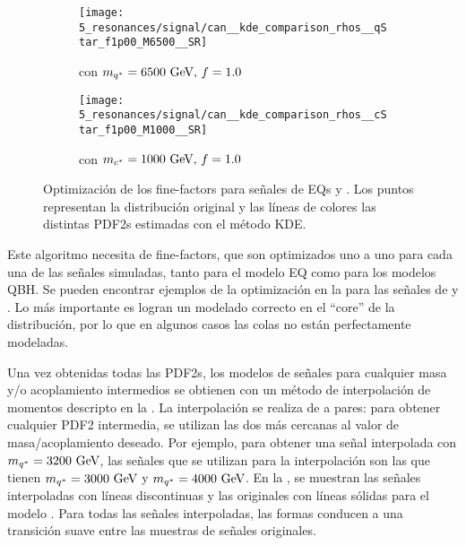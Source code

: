 \begin{figure}[ht!]
    \centering
    \begin{subfigure}[h]{0.49\linewidth}
        \centering
        \texttt{[image: 5\_resonances/signal/can\_\_kde\_comparison\_rhos\_\_qStar\_f1p00\_M6500\_\_SR]}
        \caption{\qstar con \(m_{q^*} = 6500~\text{GeV},\, f=1.0\)}
        \label{fig:signals:modeling:fine_factor_optimization_qstar}
    \end{subfigure}
    \begin{subfigure}[h]{0.49\linewidth}
        \centering
        \texttt{[image: 5\_resonances/signal/can\_\_kde\_comparison\_rhos\_\_cStar\_f1p00\_M1000\_\_SR]}
        \caption{\cstar con \(m_{c^*} = 1000~\text{GeV},\, f=1.0\)}
        \label{fig:signals:modeling:fine_factor_optimization_cstar}
    \end{subfigure}
    \caption{Optimización de los fine-factors para señales de \acp{EQ} \qstar y \cstar. Los puntos representan la distribución original y las líneas de colores las distintas \acp{PDF2} estimadas con el m\'etodo \ac{KDE}.}
    \label{fig:signals:modeling:fine_factor_optimization}
\end{figure}

Este algoritmo necesita de fine-factors, que son optimizados uno a uno para cada una de las señales simuladas, tanto para el modelo \ac{EQ} como para los modelos \ac{QBH}. Se pueden encontrar ejemplos de la optimización en la \Fig{\ref{fig:signals:modeling:fine_factor_optimization}} para las señales de \qstar y \cstar. Lo más importante es logran un modelado correcto en el \enquote{core} de la distribución, por lo que en algunos casos las colas no están perfectamente modeladas.

Una vez obtenidas todas las \acp{PDF2}, los modelos de señales para cualquier masa y/o acoplamiento intermedios se obtienen con un método de interpolación de momentos descripto en la . La interpolación se realiza de a pares: para obtener cualquier \ac{PDF2} intermedia, se utilizan las dos más cercanas al valor de masa/acoplamiento deseado. Por ejemplo, para obtener una señal interpolada con \(m_{q^*} = 3200~\text{GeV}\), las señales que se utilizan para la interpolación son las que tienen \(m_{q^*} = 3000~\text{GeV}\) y \(m_{q^*} = 4000~\text{GeV}\).
En la \Fig{\ref{fig:signals:modeling:final_interpolation}}, se muestran las señales interpoladas con líneas discontinuas y las originales con líneas sólidas para el modelo \qstar. Para todas las señales interpoladas, las formas conducen a una transición suave entre las muestras de señales originales.


